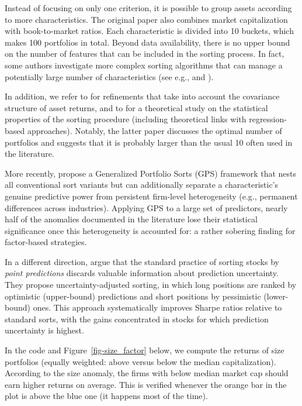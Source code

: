 Instead of focusing on only one criterion, it is possible to group assets according to more characteristics. The original paper \cite{fama1992cross} also combines market capitalization with book-to-market ratios. Each characteristic is divided into 10 buckets, which makes 100 portfolios in total. Beyond data availability, there is no upper bound on the number of features that can be included in the sorting process. In fact, some authors investigate more complex sorting algorithms that can manage a potentially large number of characteristics (see e.g., \cite{feng2019taming} and \cite{bryzgalova2019bayesian}).

In addition, we refer to \cite{ledoit2018efficient} for refinements that take into account the covariance structure of asset returns, and to \cite{cattaneo2019characteristic} for a theoretical study on the statistical properties of the sorting procedure (including theoretical links with regression-based approaches). Notably, the latter paper discusses the optimal number of portfolios and suggests that it is probably larger than the usual 10 often used in the literature.

More recently, \cite{hoechle2025generalized} propose a Generalized Portfolio Sorts (GPS) framework that nests all conventional sort variants but can additionally separate a characteristic's genuine predictive power from persistent firm-level heterogeneity (e.g., permanent differences across industries). Applying GPS to a large set of predictors, nearly half of the anomalies documented in the literature lose their statistical significance once this heterogeneity is accounted for: a rather sobering finding for factor-based strategies.

In a different direction, \cite{liu2026uncertainty} argue that the standard practice of sorting stocks by \textit{point predictions} discards valuable information about prediction uncertainty. They propose uncertainty-adjusted sorting, in which long positions are ranked by optimistic (upper-bound) predictions and short positions by pessimistic (lower-bound) ones. This approach systematically improves Sharpe ratios relative to standard sorts, with the gains concentrated in stocks for which prediction uncertainty is highest.

In the code and Figure~\ref{fig-size_factor} below, we compute the returns of size portfolios (equally weighted: above versus below the median capitalization). According to the size anomaly, the firms with below median market cap should earn higher returns on average. This is verified whenever the orange bar in the plot is above the blue one (it happens most of the time).

